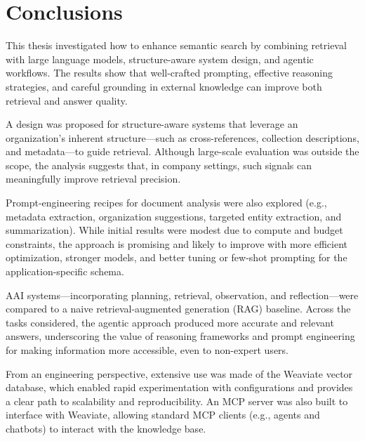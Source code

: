 \cleardoublepage%
\label{chap:conclusion}%


\section{Conclusions}
This thesis investigated how to enhance semantic search by combining retrieval with large language models, structure-aware system design, and agentic workflows. The results show that well-crafted prompting, effective reasoning strategies, and careful grounding in external knowledge can improve both retrieval and answer quality.

A design was proposed for structure-aware systems that leverage an organization's inherent structure—such as cross-references, collection descriptions, and metadata—to guide retrieval. Although large-scale evaluation was outside the scope, the analysis suggests that, in company settings, such signals can meaningfully improve retrieval precision.

Prompt-engineering recipes for document analysis were also explored (e.g., metadata extraction, organization suggestions, targeted entity extraction, and summarization). While initial results were modest due to compute and budget constraints, the approach is promising and likely to improve with more efficient optimization, stronger models, and better tuning or few-shot prompting for the application-specific schema.

\gls{AAI} systems—incorporating planning, retrieval, observation, and reflection—were compared to a naive retrieval-augmented generation (\gls{RAG}) baseline. Across the tasks considered, the agentic approach produced more accurate and relevant answers, underscoring the value of reasoning frameworks and prompt engineering for making information more accessible, even to non-expert users.

From an engineering perspective, extensive use was made of the Weaviate vector database, which enabled rapid experimentation with configurations and provides a clear path to scalability and reproducibility. An \gls{MCP} server was also built to interface with Weaviate, allowing standard \gls{MCP} clients (e.g., agents and chatbots) to interact with the knowledge base.

